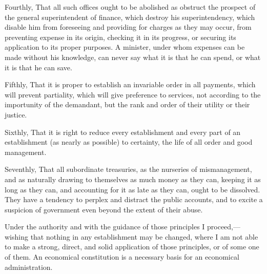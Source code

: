 Fourthly, That all such offices ought to be abolished as obstruct the prospect of the general superintendent of finance, which destroy his superintendency, which disable him from foreseeing and providing for charges as they may occur, from preventing expense in its origin, checking it in its progress, or securing its application to its proper purposes. A minister, under whom expenses can be made without his knowledge, can never say what it is that he can spend, or what it is that he can save.

Fifthly, That it is proper to establish an invariable order in all payments, which will prevent partiality, which will give preference to services, not according to the importunity of the demandant, but the rank and order of their utility or their justice.

Sixthly, That it is right to reduce every establishment and every part of an establishment (as nearly as possible) to certainty, the life of all order and good management.

Seventhly, That all subordinate treasuries, as the nurseries of mismanagement, and as naturally drawing to themselves as much money as they can, keeping it as long as they can, and accounting for it as late as they can, ought to be dissolved. They have a tendency to perplex and distract the public accounts, and to excite a suspicion of government even beyond the extent of their abuse.

Under the authority and with the guidance of those principles I proceed,—wishing that nothing in any establishment may be changed, where I am not able to make a strong, direct, and solid application of those principles, or of some one of them. An economical constitution is a necessary basis for an economical administration.

